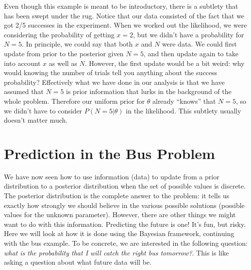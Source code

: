 Even though this example is meant to be introductory, there is a subtlety
that has been swept under the rug. Notice that our data consisted of the fact
that we got 2/5 successes in the experiment. When we worked out the likelihood,
we were considering the probability of getting $x=2$, but we didn't have a
probability for $N=5$. In principle, we could say that both $x$ and $N$ were data.
We could first update from prior to the posterior given $N=5$, and then update
again to take into account $x$ as well as $N$. However, the first update would
be a bit weird: why would knowing the number of trials tell you anything about
the success probability? Effectively what we have done in our analysis is that
we have assumed that $N=5$ is prior information that lurks in the background of
the whole problem. Therefore our uniform prior for $\theta$ already ``knows''
that $N=5$, so we didn't have to consider $P(N=5|\theta)$ in the likelihood.
This subtlety usually doesn't matter much.

\section{Prediction in the Bus Problem}
We have now seen how to use information (data) to update from a prior distribution
to a posterior distribution when the set of possible values is discrete. The
posterior distribution is the complete answer to the problem: it tells us exactly
how strongly we should believe in the various possible solutions (possible
values for the unknown parameter). However, there
are other things we might want to do with this information. Predicting the future
is one! It's fun, but risky. Here we will look at how it is done using the Bayesian
framework, continuing with the bus example. To be concrete, we are interested
in the following question: {\it what is the probability that I will catch the
right bus tomorrow?}. This is like asking a question about what future data
will be.

